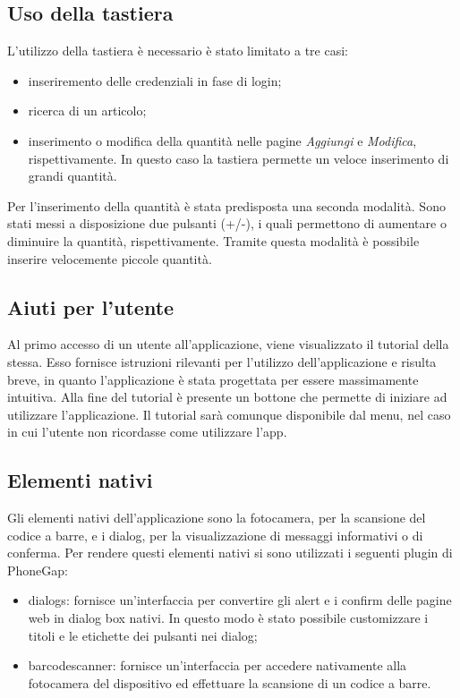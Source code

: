 \documentclass[12pt, a4paper, titlepage]{report}
\begin{document}
	\subsection{Uso della tastiera}
	
	L'utilizzo della tastiera è necessario è stato limitato a tre casi:
	\begin{itemize}
		\item inseriremento delle credenziali in fase di login;
		\item ricerca di un articolo;
		\item inserimento o modifica della quantità nelle pagine \textit{Aggiungi} e \textit{Modifica}, rispettivamente. In questo caso la tastiera permette un veloce inserimento di grandi quantità.
	\end{itemize}
	Per l'inserimento della quantità è stata predisposta una seconda modalità. Sono stati messi a disposizione due pulsanti (+/-), i quali permettono di aumentare o diminuire la quantità, rispettivamente. Tramite questa modalità è possibile inserire velocemente piccole quantità.
	
	\subsection{Aiuti per l'utente}
	
	Al primo accesso di un utente all'applicazione, viene visualizzato il tutorial della stessa. Esso fornisce istruzioni rilevanti per l'utilizzo dell'applicazione e risulta breve, in quanto l'applicazione è stata progettata per essere massimamente intuitiva. Alla fine del tutorial è presente un bottone che permette di iniziare ad utilizzare l'applicazione. Il tutorial sarà comunque disponibile dal menu, nel caso in cui l'utente non ricordasse come utilizzare l'app.
	
	\subsection{Elementi nativi}
	
	Gli elementi nativi dell'applicazione sono la fotocamera, per la scansione del codice a barre, e i dialog, per la visualizzazione di messaggi informativi o di conferma. Per rendere questi elementi nativi si sono utilizzati i seguenti plugin di PhoneGap:
	\begin{itemize}
		\item dialogs: fornisce un'interfaccia per convertire gli alert e i confirm delle pagine web in dialog box nativi. In questo modo è stato possibile customizzare i titoli e le etichette dei pulsanti nei dialog;
		\item barcodescanner: fornisce un'interfaccia per accedere nativamente alla fotocamera del dispositivo ed effettuare la scansione di un codice a barre.
	\end{itemize}
\end{document}
